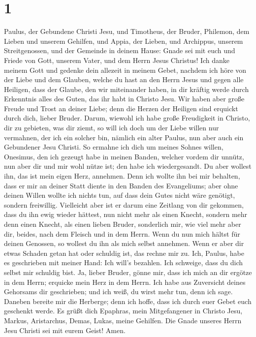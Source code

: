 \hypertarget{section}{%
\section{1}\label{section}}

 Paulus, der Gebundene Christi Jesu, und Timotheus, der
Bruder, Philemon, dem Lieben und unserem Gehilfen,  und
Appia, der Lieben, und Archippus, unserem Streitgenossen, und der
Gemeinde in deinem Hause:  Gnade sei mit euch und Friede von
Gott, unserem Vater, und dem Herrn Jesus Christus!  Ich
danke meinem Gott und gedenke dein allezeit in meinem Gebet,
 nachdem ich höre von der Liebe und dem Glauben, welche du
hast an den Herrn Jesus und gegen alle Heiligen,  dass der
Glaube, den wir miteinander haben, in dir kräftig werde durch Erkenntnis
alles des Guten, das ihr habt in Christo Jesu.  Wir haben
aber große Freude und Trost an deiner Liebe; denn die Herzen der
Heiligen sind erquickt durch dich, lieber Bruder.  Darum,
wiewohl ich habe große Freudigkeit in Christo, dir zu gebieten, was dir
ziemt,  so will ich doch um der Liebe willen nur vermahnen,
der ich ein solcher bin, nämlich ein alter Paulus, nun aber auch ein
Gebundener Jesu Christi.  So ermahne ich dich um meines
Sohnes willen, Onesimus, den ich gezeugt habe in meinen Banden,
 welcher vordem dir unnütz, nun aber dir und mir wohl nütze
ist; den habe ich wiedergesandt.  Du aber wollest ihn, das
ist mein eigen Herz, annehmen.  Denn ich wollte ihn bei mir
behalten, dass er mir an deiner Statt diente in den Banden des
Evangeliums;  aber ohne deinen Willen wollte ich nichts
tun, auf dass dein Gutes nicht wäre genötigt, sondern freiwillig.
 Vielleicht aber ist er darum eine Zeitlang von dir
gekommen, dass du ihn ewig wieder hättest,  nun nicht mehr
als einen Knecht, sondern mehr denn einen Knecht, als einen lieben
Bruder, sonderlich mir, wie viel mehr aber dir, beides, nach dem Fleisch
und in dem Herrn.  Wenn du nun mich hältst für deinen
Genossen, so wollest du ihn als mich selbst annehmen.  Wenn
er aber dir etwas Schaden getan hat oder schuldig ist, das rechne mir
zu.  Ich, Paulus, habe es geschrieben mit meiner Hand: Ich
will's bezahlen. Ich schweige, dass du dich selbst mir schuldig bist.
 Ja, lieber Bruder, gönne mir, dass ich mich an dir ergötze
in dem Herrn; erquicke mein Herz in dem Herrn.  Ich habe
aus Zuversicht deines Gehorsams dir geschrieben; und ich weiß, du wirst
mehr tun, denn ich sage.  Daneben bereite mir die Herberge;
denn ich hoffe, dass ich durch euer Gebet euch geschenkt werde.
 Es grüßt dich Epaphras, mein Mitgefangener in Christo
Jesu,  Markus, Aristarchus, Demas, Lukas, meine Gehilfen.
 Die Gnade unseres Herrn Jesu Christi sei mit eurem Geist!
Amen.
